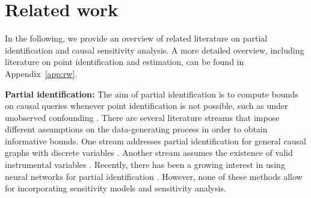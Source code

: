 \documentclass{article} %
\theoremstyle{definition}
\theoremstyle{plain}
\begin{document}

\section{Related work}\label{sec:rw}

In the following, we provide an overview of related literature on partial identification and causal sensitivity analysis. A more detailed overview, including literature on point identification and estimation, can be found in Appendix~\ref{app:rw}.

\textbf{Partial identification:} The aim of partial identification is to compute bounds on causal queries whenever point identification is not possible, such as under unobserved confounding \citep{Manski.1990}. There are several literature streams that impose different assumptions on the data-generating process in order to obtain informative bounds. One stream addresses partial identification for general causal graphs with discrete variables \citep{Duarte.2023}. Another stream assumes the existence of valid instrumental variables \citep{Gunsilius.2020, Kilbertus.2020}. Recently, there has been a growing interest in using neural networks for partial identification \citep{Xia.2021, Xia.2023, Padh.2023}. However, none of these methods allow for incorporating sensitivity models and sensitivity analysis.
\end{document}
